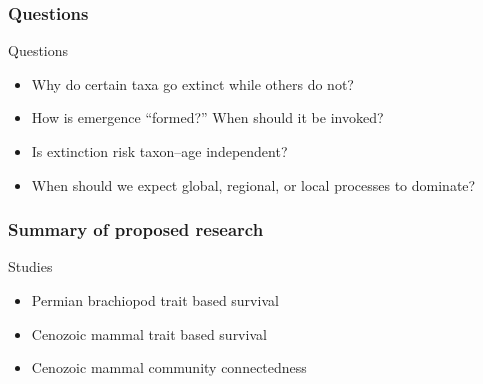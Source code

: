 \documentclass{beamer} \usepackage{amsmath,amsthm}
\begin{document}
\begin{frame}
  \frametitle{Questions}

  \begin{alertblock}{Questions}
    \begin{itemize}
      \item Why do certain taxa go extinct while others do not?
      \item How is emergence ``formed?'' When should it be invoked?
      \item Is extinction risk taxon--age independent?
      \item When should we expect global, regional, or local processes to dominate?
    \end{itemize}
  \end{alertblock}
\end{frame}

\begin{frame}
  \frametitle{Summary of proposed research}

  \begin{alertblock}{Studies}
    \begin{itemize}
      \item Permian brachiopod trait based survival %
      \item Cenozoic mammal trait based survival %
      \item Cenozoic mammal community connectedness %
    \end{itemize}
  \end{alertblock}

\end{frame}
\end{document}
